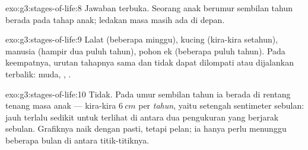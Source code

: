 \begin{solution}{exo:g3:stages-of-life:8}
Jawaban terbuka. Seorang anak berumur sembilan tahun berada pada tahap
anak; ledakan masa  masih ada di depan.
\end{solution}

\begin{solution}{exo:g3:stages-of-life:9}
Lalat (beberapa minggu), kucing (kira-kira setahun), manusia (hampir
dua puluh tahun), pohon ek (beberapa puluh tahun). Pada keempatnya,
urutan tahapnya sama dan tidak dapat dilompati atau dijalankan
terbalik: muda, , .
\end{solution}

\begin{solution}{exo:g3:stages-of-life:10}
Tidak. Pada umur sembilan tahun ia berada di rentang tenang masa anak
--- kira-kira $\qty{6}{cm}$ per \emph{tahun}, yaitu setengah
sentimeter sebulan: jauh terlalu sedikit untuk terlihat di antara dua
pengukuran yang berjarak sebulan. Grafiknya naik dengan pasti, tetapi
pelan; ia hanya perlu menunggu beberapa bulan di antara titik-titiknya.
\end{solution}
